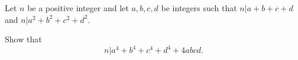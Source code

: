 Let $n$ be a positive integer and let $a, b, c, d$ be integers such that $n | a + b + c + d$ and $n | a^2 + b^2 + c^2 + d^2. $

Show that $$n | a^4 + b^4 + c^4 + d^4 + 4abcd.$$